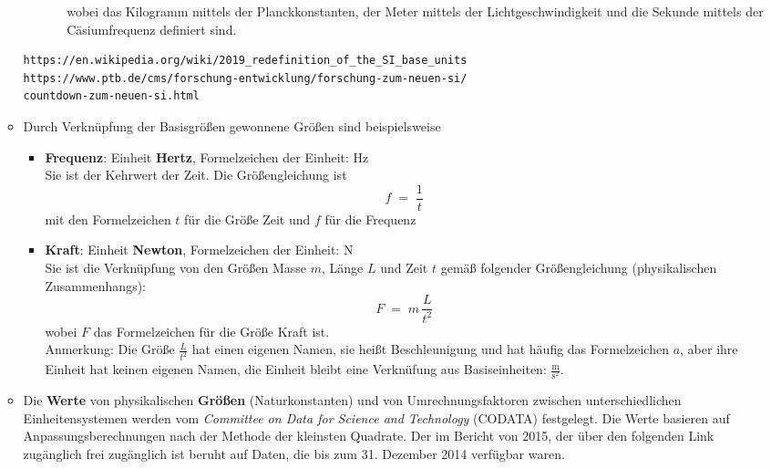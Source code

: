 \begin{raggedright}
\begin{enumerate}
\begin{itemize}
\begin{enumerate}[1.)]
\begin{itemize}
      wobei das Kilogramm mittels der Planckkonstanten, der Meter mittels
      der Lichtgeschwindigkeit und die Sekunde mittels der Cäsiumfrequenz definiert sind.
			\end{itemize}
		\end{enumerate}
	\begin{verbatim}
https://en.wikipedia.org/wiki/2019_redefinition_of_the_SI_base_units
https://www.ptb.de/cms/forschung-entwicklung/forschung-zum-neuen-si/
countdown-zum-neuen-si.html
	\end{verbatim}
	\item Durch Verknüpfung der Basisgrößen gewonnene Größen sind beispielsweise
		\begin{itemize}
		\item \textbf{Frequenz}: Einheit \textbf{Hertz}, Formelzeichen der Einheit: Hz\\
			Sie ist der Kehrwert der Zeit. Die Größengleichung ist
\begin{equation}
			f \; = \; \frac{1}{t}
\end{equation}
			mit den Formelzeichen $t$ für die Größe Zeit und $f$ für die Frequenz
		\item \textbf{Kraft}: Einheit \textbf{Newton}, Formelzeichen der Einheit: N\\
			Sie ist die Verknüpfung von den Größen Masse $m$, Länge $L$ und Zeit $t$
			gemäß folgender Größengleichung (physikalischen Zusammenhangs):
\begin{equation}
			F \; = \; m \, \frac{L}{t^2}
\end{equation}
			wobei $F$ das Formelzeichen für die Größe Kraft ist.\\
			Anmerkung: Die Größe $\frac{L}{t^2}$ hat einen eigenen Namen, sie heißt
			Beschleunigung und hat häufig das Formelzeichen $a$, aber ihre Einheit hat keinen
			eigenen Namen, die Einheit bleibt eine Verknüfung aus Basiseinheiten:
			$\frac{\mathrm{m}}{\mathrm{s}^2}$.
		\end{itemize}
		\item Die \textbf{Werte} von physikalischen \textbf{Größen} (Naturkonstanten) 
			und von Umrechnungsfaktoren zwischen unterschiedlichen
			Einheitensystemen werden vom \textsl{Committee on Data for Science and Technology} (CODATA)
			festgelegt. Die Werte basieren auf Anpassungsberechnungen nach der Methode der kleinsten
			Quadrate. Der im Bericht von 2015, der über den folgenden Link zugänglich frei zugänglich ist
			beruht auf Daten, die bis zum 31. Dezember 2014 verfügbar waren.
	\begin{verbatim}

\end{verbatim}
\end{itemize}
\end{enumerate}
\end{raggedright}

